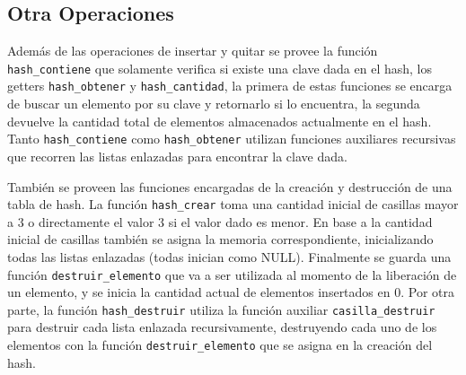 \documentclass[titlepage,a4paper]{article}
\begin{document}
                         \subsection{Otra Operaciones}

Además de las operaciones de insertar y quitar se provee la función
\lstinline{hash_contiene} que solamente verifica si existe una clave dada en el
hash, los getters \lstinline{hash_obtener} y \lstinline{hash_cantidad}, la
primera de estas funciones se encarga de buscar un elemento por su clave y
retornarlo si lo encuentra, la segunda devuelve la cantidad total de elementos
almacenados actualmente en el hash. Tanto \lstinline{hash_contiene} como
\lstinline{hash_obtener} utilizan funciones auxiliares recursivas que recorren
las listas enlazadas para encontrar la clave dada.

También se proveen las funciones encargadas de la creación y destrucción de una tabla de hash. La función \lstinline{hash_crear} toma una cantidad inicial de casillas mayor a $3$ o directamente el valor $3$ si el valor dado es menor. En base a la cantidad inicial de casillas también se asigna la memoria correspondiente, inicializando todas las listas enlazadas (todas inician como NULL). Finalmente se guarda una función \lstinline{destruir_elemento} que va a ser utilizada al momento de la liberación de un elemento, y se inicia la cantidad actual de elementos insertados en $0$. Por otra parte, la función \lstinline{hash_destruir} utiliza la función auxiliar \lstinline{casilla_destruir} para destruir cada lista enlazada recursivamente, destruyendo cada uno de los elementos con la función \lstinline{destruir_elemento} que se asigna en la creación del hash.
\end{document}
